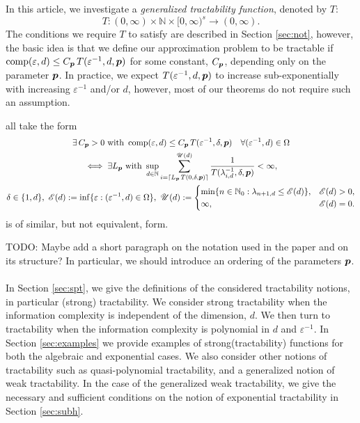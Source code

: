 \documentclass[sort&compress]{elsarticle}
\newcommand{\thed}{\delta}
\newcommand{\theM}{\mathscr{E}}
\newcommand{\theUB}{\mathscr{U}}
\newcommand{\peter}[1]{\begingroup\color{purple}#1\endgroup}
\begin{document}
In this article, we investigate a \emph{generalized tractability function}, denoted by $T$:
\begin{equation} \label{eq:Tspec}
    T :(0,\infty) \times \mathbb{N} \times [0,\infty)^s \rightarrow (0,\infty).
\end{equation}
The conditions we require $T$ to satisfy are described in  Section \ref{sec:not}, however, the basic idea is that we define our approximation problem to be tractable if $\operatorname{comp}(\varepsilon, d) \le  C_{\boldsymbol{p}}\, T(\varepsilon^{-1},d,\boldsymbol{p})$ for some constant, $C_{\boldsymbol{p}}$, depending only on the parameter $\boldsymbol{p}$.  In practice, we expect $T(\varepsilon^{-1},d,\boldsymbol{p})$ to increase sub-exponentially  with increasing $\varepsilon^{-1}$ and/or $d$, however, most of our theorems do not require such an assumption.

 all take the form
\begin{multline}
  \exists \,C_{\vp} > 0 \text{ with }
    \comp(\varepsilon, d) \le  C_{\vp}\, T(\varepsilon^{-1},\thed,\vp) \quad \forall (\varepsilon^{-1},d) \in \Omega \\
    \iff   \exists L_{\vp} \text{ with }
    \sup_{d \in \naturals}
     \sum_{i = \lceil L_{\vp}\, T(0,\thed,\vp) \rceil}^{\theUB(d)} \frac{1}{T(\lambda^{-1}_{i,d},\thed,\vp)}< \infty, \\
     \thed \in \{1,d\}, \ \theM(d) := \inf \{\varepsilon : (\varepsilon^{-1},d) \in \Omega \}, \ 
     \theUB(d) := \begin{cases}
        \min\{n \in \natzero : \lambda_{n+1,d} \le \theM(d) \}, &   \theM(d) > 0, \\
        \infty, & \theM(d) = 0.
        \end{cases}
\end{multline}
 is of similar, but not equivalent, form.


\peter{TODO: Maybe add a short paragraph on the notation used in the paper and on its structure? In particular, we should introduce
an ordering of the parameters $\boldsymbol{p}$.}\\
\\


In Section \ref{sec:spt}, we give the definitions of the considered tractability notions, in particular (strong) tractability. We consider strong tractability when the information complexity is independent of the dimension, $d$. We then turn to tractability  when the information complexity is polynomial in $d$ and $\varepsilon^{-1}$. In Section \ref{sec:examples} we provide examples of strong(tractability) functions for both the algebraic and exponential cases. We also consider other notions of tractability such as quasi-polynomial tractability, and a generalized notion of weak tractability. In the case of the generalized weak tractability, we give the necessary and sufficient conditions on the notion of exponential tractability in Section \ref{sec:subh}. 
\end{document}

